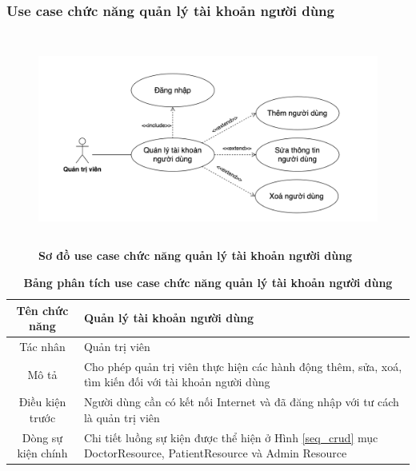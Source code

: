 \subsubsection{Use case chức năng quản lý tài khoản người dùng}
  \begin{figure}[H]
    \centering
    \includegraphics[width=15cm,height=7cm]{Images/use_case/use_case_manage_users.png}
    \caption[Sơ đồ use case chức năng quản lý tài khoản người dùng]{\bfseries \fontsize{12pt}{0pt}
    \selectfont Sơ đồ use case chức năng quản lý tài khoản người dùng}
    \label{use_case_manage_users} %
  \end{figure}

  \begin{table}[H]
    \caption{\bfseries \fontsize{12pt}{0pt}\selectfont Bảng phân tích use case chức năng quản lý tài khoản người dùng}
    \centering
    \begin{tabularx}{0.9\textwidth}{|c|X|}
      \hline
      \textbf{Tên chức năng} & \textbf{Quản lý tài khoản người dùng} \\
      \hline
      Tác nhân & Quản trị viên \\
      \hline
      Mô tả & Cho phép quản trị viên thực hiện các hành động thêm, sửa, xoá, tìm kiến đối với tài khoản người dùng \\
      \hline
      Điều kiện trước & Người dùng cần có kết nối Internet và đã đăng nhập với tư cách là quản trị viên \\
      \hline
      Dòng sự kiện chính & 
        Chi tiết luồng sự kiện được thể hiện ở Hình \ref{seq_crud} mục DoctorResource, PatientResource và Admin Resource\\
      \hline
    \end{tabularx}
  \end{table}

